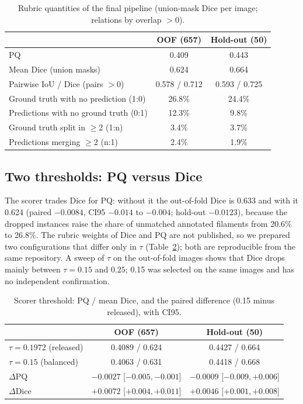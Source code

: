 \documentclass[sigconf]{acmart}
\begin{document}
\begin{table}[t]
\centering
\caption{Rubric quantities of the final pipeline (union-mask Dice per image; relations by overlap $>0$).}
\label{tab:rubric}
\small
\begin{tabular}{@{}lcc@{}}
\toprule
 & OOF (657) & Hold-out (50)\\
\midrule
PQ & 0.409 & 0.443\\
Mean Dice (union masks) & 0.624 & 0.664\\
Pairwise IoU / Dice (pairs $>0$) & 0.578 / 0.712 & 0.593 / 0.725\\
Ground truth with no prediction (1:0) & 26.8\% & 24.4\%\\
Predictions with no ground truth (0:1) & 12.3\% & 9.8\%\\
Ground truth split in $\ge$2 (1:n) & 3.4\% & 3.7\%\\
Predictions merging $\ge$2 (n:1) & 2.4\% & 1.9\%\\
\bottomrule
\end{tabular}
\end{table}

\subsection{Two thresholds: PQ versus Dice}
The scorer trades Dice for PQ: without it the out-of-fold Dice is 0.633 and with it 0.624 (paired $-0.0084$, CI95 $-0.014$ to $-0.004$; hold-out $-0.0123$), because the dropped instances raise the share of unmatched annotated filaments from 20.6\% to 26.8\%. The rubric weights of Dice and PQ are not published, so we prepared two configurations that differ only in $\tau$ (Table~\ref{tab:tau}); both are reproducible from the same repository. A sweep of $\tau$ on the out-of-fold images shows that Dice drops mainly between $\tau{=}0.15$ and $0.25$; 0.15 was selected on the same images and has no independent confirmation.

\begin{table}[t]
\centering
\caption{Scorer threshold: PQ / mean Dice, and the paired difference (0.15 minus released), with CI95.}
\label{tab:tau}
\small
\begin{tabular}{@{}lcc@{}}
\toprule
 & OOF (657) & Hold-out (50)\\
\midrule
$\tau{=}0.1972$ (released) & 0.4089 / 0.624 & 0.4427 / 0.664\\
$\tau{=}0.15$ (balanced) & 0.4063 / 0.631 & 0.4418 / 0.668\\
$\Delta$PQ & $-0.0027$ [$-0.005,-0.001$] & $-0.0009$ [$-0.009,+0.006$]\\
$\Delta$Dice & $+0.0072$ [$+0.004,+0.011$] & $+0.0046$ [$+0.001,+0.008$]\\
\bottomrule
\end{tabular}
\end{table}
\end{document}
